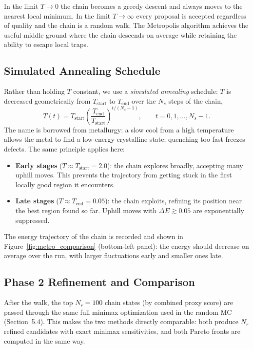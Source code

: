 \documentclass[11pt, letterpaper]{article}
\begin{document}
In the limit $T \to 0$ the chain becomes a greedy descent and always moves
to the nearest local minimum.  In the limit $T \to \infty$ every proposal is
accepted regardless of quality and the chain is a random walk.  The
Metropolis algorithm achieves the useful middle ground where the chain
descends on average while retaining the ability to escape local traps.

\subsection{Simulated Annealing Schedule}

Rather than holding $T$ constant, we use a \emph{simulated annealing}
schedule: $T$ is decreased geometrically from $T_\mathrm{start}$ to
$T_\mathrm{end}$ over the $N_s$ steps of the chain,
\begin{equation}
  T(t) = T_\mathrm{start}
    \left(\frac{T_\mathrm{end}}{T_\mathrm{start}}\right)^{t/(N_s - 1)},
    \qquad t = 0, 1, \dots, N_s - 1.
\end{equation}
The name is borrowed from metallurgy: a slow cool from a high temperature
allows the metal to find a low-energy crystalline state; quenching too fast
freezes defects.  The same principle applies here:
\begin{itemize}[noitemsep]
  \item \textbf{Early stages} ($T \approx T_\mathrm{start} = 2.0$): the chain
        explores broadly, accepting many uphill moves.  This prevents the
        trajectory from getting stuck in the first locally good region it
        encounters.
  \item \textbf{Late stages} ($T \approx T_\mathrm{end} = 0.05$): the chain
        exploits, refining its position near the best region found so far.
        Uphill moves with $\Delta E \gtrsim 0.05$ are exponentially suppressed.
\end{itemize}

The energy trajectory of the chain is recorded and shown in
Figure~\ref{fig:metro_comparison} (bottom-left panel): the energy should
decrease on average over the run, with larger fluctuations early and smaller
ones late.

\subsection{Phase 2 Refinement and Comparison}

After the walk, the top $N_r = 100$ chain states (by combined proxy score)
are passed through the same full minimax optimization used in the random MC
(Section~5.4).  This makes the two methods directly comparable: both produce
$N_r$ refined candidates with exact minimax sensitivities, and both Pareto
fronts are computed in the same way.
\end{document}
